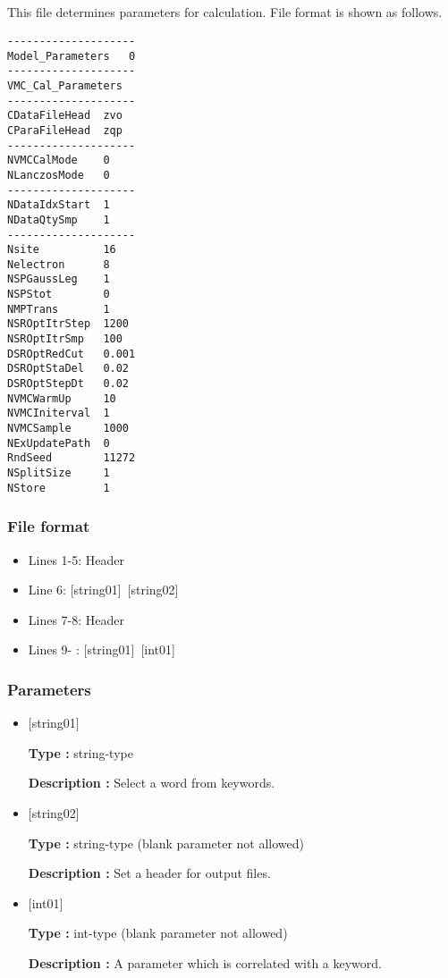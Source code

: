 \newpage
\subsection{}
\label{Subsec:modpara}
This file determines parameters for calculation. File format is shown as follows.\\
\begin{minipage}{10cm}
\begin{screen}
\begin{verbatim}
--------------------
Model_Parameters   0
--------------------
VMC_Cal_Parameters
--------------------
CDataFileHead  zvo
CParaFileHead  zqp
--------------------
NVMCCalMode    0
NLanczosMode   0
--------------------
NDataIdxStart  1
NDataQtySmp    1
--------------------
Nsite          16
Nelectron      8
NSPGaussLeg    1
NSPStot        0
NMPTrans       1
NSROptItrStep  1200
NSROptItrSmp   100
DSROptRedCut   0.001
DSROptStaDel   0.02
DSROptStepDt   0.02
NVMCWarmUp     10
NVMCIniterval  1
NVMCSample     1000
NExUpdatePath  0
RndSeed        11272
NSplitSize     1
NStore         1  
\end{verbatim}
\end{screen}
\end{minipage}

\subsubsection{File format}
 \begin{itemize}
   \item  Lines 1-5:  Header
   \item  Line 6:  [string01]~[string02]
   \item  Lines 7-8:  Header
   \item  Lines 9- : [string01]~[int01]
  \end{itemize}

\subsubsection{Parameters}
\begin{itemize}
   \item  $[$string01$]$
   
   {\bf Type :} string-type

  {\bf Description :} Select a word from keywords.
   
   \item  $[$string02$]$
   
   {\bf Type :} string-type (blank parameter not allowed)

  {\bf Description :} Set a header for output files.

   \item  $[$int01$]$
   
   {\bf Type :} int-type (blank parameter not allowed)

  {\bf Description :} A parameter which is correlated with a keyword.
  \end{itemize}

